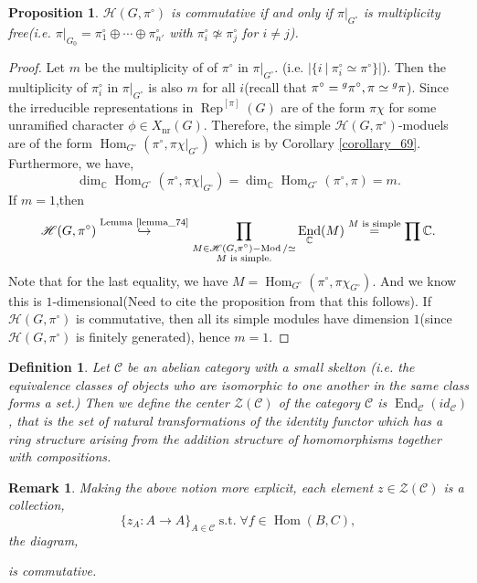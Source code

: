 \documentclass[8pt]{article}
\newtheorem{proposition}{Proposition}[section]
\newtheorem{definition}{Definition}[section]
\newtheorem{remark}{Remark}[section]
\DeclareMathOperator{\st}{s.t.}
\DeclareMathOperator{\Rep}{Rep}
\DeclareMathOperator{\Hom}{Hom}
\DeclareMathOperator{\End}{End}
\DeclareMathOperator{\Mod}{Mod}
\newcommand{\C}[0]{\mathbb{C}}
\newcommand{\sep}[0]{\:|\:}
\newcommand{\hecke}[0]{\mathscr{H}}
\newcommand{\cat}{\mathscr{C}}
\begin{document}
\begin{proposition}
  \label{proposition_75}
  $\hecke(G,\pi^\circ)$ is commutative if and only if $\pi\vert_{G^\circ}$ is multiplicity free(i.e. $\pi|_{G_0}=\pi_1^\circ\oplus\cdots\oplus\pi_{n'}^\circ$ with $\pi^\circ_i\not\simeq\pi_j^\circ$ for $i\not=j$).
\end{proposition}
\begin{proof}
  Let $m$ be the multiplicity of of $\pi^\circ$ in $\pi|_{G^\circ}$. (i.e. $\vert\{i\sep \pi_i^\circ\simeq\pi^\circ\}\vert$).
  Then the multiplicity of $\pi_i^\circ$ in $\pi|_{G^\circ}$ is also $m$ for all $i$(recall that $\pi^\circ=\prescript{g}{}{\pi}^\circ, \pi\simeq\prescript{g}{}{\pi}$). 
  Since the irreducible representations in $\Rep^{[\pi]}(G)$ are of the form $\pi\chi$ for some unramified character $\phi\in X_{\text{nr}}(G)$. Therefore, the simple $\hecke(G,\pi^\circ)$-moduels are of the form $\Hom_{G^\circ}(\pi^\circ,\pi\chi|_{G^\circ})$ which is by Corollary \ref{corollary_69}.
  Furthermore, we have,
  \begin{equation*}
    \dim_\C\Hom_{G^\circ}(\pi^\circ,\pi\chi|_{G^\circ}) = \dim_\C\Hom_{G^\circ}(\pi^\circ,\pi) = m.
  \end{equation*}
  If $m=1$,then 
  \begin{equation*}
    \hecke(G,\pi^\circ)\stackrel{\text{Lemma \ref{lemma_74}}}{\hookrightarrow}\prod_{\substack{M\in\hecke(G,\pi^\circ)-\Mod/\simeq\\\text{$M$ is simple.}}}\End_\C(M) \stackrel{\text{$M$ is simple}}{=} \prod\C.
  \end{equation*}
  Note that for the last equality, we have $M=\Hom_{G^\circ}(\pi^\circ,\pi\chi_{G^\circ})$. And we know this is $1$-dimensional(Need to cite the proposition from that this follows).
  If $\hecke(G,\pi^\circ)$ is commutative, then all its simple modules have dimension $1$(since $\hecke(G,\pi^\circ)$ is finitely generated), hence $m=1$.
\end{proof}
\begin{definition}
  Let $\cat$ be an abelian category with a small skelton (i.e. the equivalence classes of objects who are isomorphic to one another in the same class forms a set.)
  Then we define the center $\mathcal{Z}(\cat)$ of the category $\cat$ is $\End_\cat(id_\cat)$, that is the set of natural transformations of the identity functor which has a ring structure arising from the addition structure of homomorphisms together with compositions.
\end{definition}
\begin{remark}
  Making the above notion more explicit, each element $z\in\mathcal{Z}(\cat)$ is a collection, 
  \begin{equation*}
    \{z_A:A\to A\}_{A\in\cat}\st \forall f\in\Hom(B,C),
  \end{equation*}
  the diagram, 
  \begin{center}
  \end{center}
  is commutative. 
\end{remark}
\end{document}
